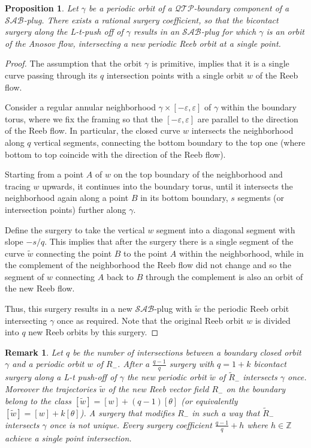 \documentclass{amsart}
\newtheorem{proposition}[theorem]{Proposition}
\newtheorem{remark}[theorem]{Remark}
\theoremstyle{definition}
\theoremstyle{remark}
\begin{document}
 
 
 \begin{proposition}\label{pro:one intersection}
 Let $\gamma$ be a periodic orbit of a $\mathcal{QTP}$-boundary component of a $\mathcal{SAB}$-plug.
 There exists a rational surgery coefficient, so that the bicontact surgery along the L-t-push off of $\gamma$ results in an $\mathcal{SAB}$-plug for which $\gamma$ is an orbit of the Anosov flow, intersecting a new periodic Reeb orbit at a single point.
 \end{proposition}

\begin{proof}
    The assumption that the orbit $\gamma$ is primitive, implies that it is a single curve passing through its $q$ intersection points with a single orbit $w$ of the Reeb flow. 
    
    Consider a regular annular neighborhood $\gamma\times[-\varepsilon,\varepsilon]$ of $\gamma$ within the boundary torus, where we fix the framing so that the $[-\varepsilon,\varepsilon]$ are parallel to the direction of the Reeb flow. In particular, the closed curve $w$  intersects the neighborhood along $q$ vertical segments, connecting the bottom boundary to the top one (where bottom to top coincide with the direction of the Reeb flow).
    
    Starting from a point $A$ of $w$ on the top boundary of the neighborhood and tracing $w$ upwards, it continues into the boundary torus, until it intersects the neighborhood again along a point $B$ in its bottom boundary, $s$ segments (or intersection points) further along $\gamma$.
    
    Define the surgery to take the vertical $w$ segment into a diagonal segment with slope $-s/q$. This implies that after the surgery there is a single segment of the curve $\tilde w$ connecting the point $B$ to the point $A$ within the neighborhood, while in the complement of the neighborhood the Reeb flow did not change and so the segment of $w$ connecting $A$ back to $B$ through the complement is also an orbit of the new Reeb flow.

    Thus, this surgery results in a new $\mathcal{SAB}$-plug with $\tilde w$ the periodic Reeb orbit intersecting $\gamma$ once as required.
    Note that the original Reeb orbit $w$ is divided into $q$ new Reeb orbits by this surgery.
\end{proof}

\begin{remark}
Let $q$ be the number of intersections between a boundary closed orbit $\gamma$ and a periodic orbit $w$ of $R_-$. After a $\frac{q-1}{q}$ surgery with $q=1+k$ bicontact surgery along a L-t push-off of $\gamma$ the new periodic orbit $\tilde{w}$ of $\tilde{R}_-$ intersects $\gamma$ once. Moreover the trajectories $\tilde{w}$ of the new Reeb vector field $R_-$ on the boundary belong to the class $[\tilde{w}]=[w]+(q-1)[\theta]$ (or equivalently $[\tilde{w}]=[w]+k[\theta]$). A surgery that modifies $R_-$ in such a way that $\tilde{R}_-$ intersects $\gamma$ once is not unique. Every surgery coefficient $\frac{q-1}{q}+h$ where $h\in \mathbb{Z}$ achieve a single point intersection.
\end{remark}
\end{document}

